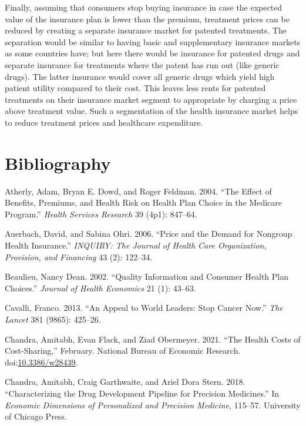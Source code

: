\documentclass[a4paper,12pt]{article}
\begin{document}
Finally, assuming that consumers stop buying insurance in case the expected value of the insurance plan is lower than the premium, treatment prices can be reduced by creating a separate insurance market for patented treatments. The separation would be similar to having basic and supplementary insurance markets as some countries have; but here there would be insurance for patented drugs and separate insurance for treatments  where the patent has run out (like generic drugs). The latter insurance would cover all generic drugs which yield high patient utility compared to their cost. This leaves less rents for patented treatments on their insurance market segment to appropriate by charging a price above treatment value. Such a segmentation of the health insurance market helps to reduce treatment prices and healthcare expenditure.

\section{Bibliography}
\label{sec:orgf399dbc}

\hypertarget{citeproc_bib_item_1}{Atherly, Adam, Bryan E. Dowd, and Roger Feldman. 2004. “The Effect of Benefits, Premiums, and Health Risk on Health Plan Choice in the Medicare Program.” \textit{Health Services Research} 39 (4p1): 847–64.}

\hypertarget{citeproc_bib_item_2}{Auerbach, David, and Sabina Ohri. 2006. “Price and the Demand for Nongroup Health Insurance.” \textit{INQUIRY: The Journal of Health Care Organization, Provision, and Financing} 43 (2): 122–34.}

\hypertarget{citeproc_bib_item_3}{Beaulieu, Nancy Dean. 2002. “Quality Information and Consumer Health Plan Choices.” \textit{Journal of Health Economics} 21 (1): 43–63.}

\hypertarget{citeproc_bib_item_4}{Cavalli, Franco. 2013. “An Appeal to World Leaders: Stop Cancer Now.” \textit{The Lancet} 381 (9865): 425–26.}

\hypertarget{citeproc_bib_item_5}{Chandra, Amitabh, Evan Flack, and Ziad Obermeyer. 2021. “The Health Costs of Cost-Sharing,” February. National Bureau of Economic Research. doi:\href{https://doi.org/10.3386/w28439}{10.3386/w28439}.}

\hypertarget{citeproc_bib_item_6}{Chandra, Amitabh, Craig Garthwaite, and Ariel Dora Stern. 2018. “Characterizing the Drug Development Pipeline for Precision Medicines.” In \textit{Economic Dimensions of Personalized and Precision Medicine}, 115–57. University of Chicago Press.}
\end{document}
